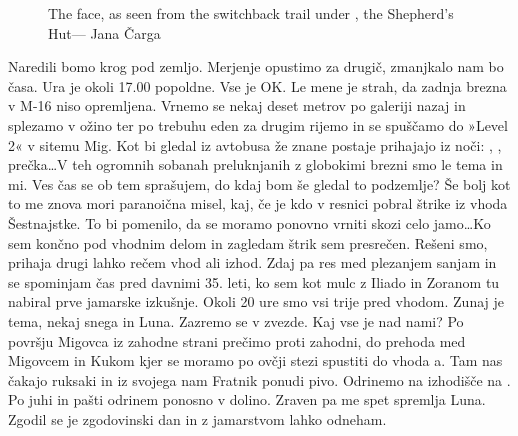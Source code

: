 \begin{figure}[t!]
\checkoddpage \ifoddpage \forcerectofloat \else \forceversofloat \fi
\centering
{}
\caption{The \protect{} face, as seen from the switchback trail under \protect{}, the Shepherd's Hut--- Jana Čarga }
\label{migovec south face}
\end{figure}

Naredili bomo krog pod zemljo. Merjenje opustimo za drugič, zmanjkalo nam bo časa. Ura je okoli 17.00 popoldne. Vse je OK. Le mene je strah, da zadnja brezna v M-16 niso opremljena. Vrnemo se nekaj deset metrov po galeriji nazaj in splezamo v ožino ter po trebuhu eden za drugim rijemo in se spuščamo do »Level 2« v sitemu Mig. Kot bi gledal iz avtobusa že znane postaje prihajajo iz noči: , ,  prečka…V teh ogromnih sobanah preluknjanih z globokimi brezni smo le tema in mi. Ves čas se ob tem sprašujem, do kdaj bom še gledal to podzemlje? Še bolj kot to me znova mori paranoična misel, kaj, če je kdo v resnici pobral štrike iz vhoda Šestnajstke. To bi pomenilo, da se moramo ponovno vrniti skozi celo jamo…Ko sem končno pod vhodnim delom in zagledam štrik sem presrečen. Rešeni smo, prihaja drugi lahko rečem vhod ali izhod. Zdaj pa res med plezanjem sanjam in se spominjam čas pred davnimi 35. leti, ko sem kot mulc z Iliado in Zoranom tu nabiral prve jamarske izkušnje. Okoli 20 ure smo vsi trije pred vhodom. Zunaj je tema, nekaj snega in Luna. Zazremo se v zvezde. Kaj vse je nad nami? Po površju Migovca iz zahodne strani prečimo proti zahodni, do prehoda med Migovcem in Kukom kjer se moramo po ovčji stezi spustiti do vhoda a. Tam nas čakajo ruksaki in iz svojega nam Fratnik ponudi pivo. Odrinemo na izhodišče na . Po juhi in pašti odrinem ponosno v dolino. Zraven pa me spet spremlja Luna. Zgodil se je zgodovinski dan in z jamarstvom lahko odneham.  
 
